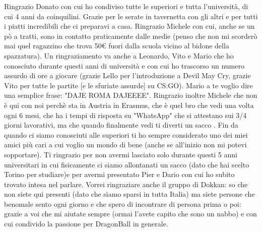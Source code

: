 Ringrazio Donato con cui ho condiviso tutte le superiori e tutta l'università, di cui 4 anni da coinquilini. Grazie per le serate in tavernetta con gli altri e per tutti i piatti incredibili che ci preparavi a casa. Ringrazio Michele con cui, anche se un pò a tratti, sono in contatto praticamente dalle medie (penso che non mi scorderò mai quel ragazzino che trova 50€ fuori dalla scuola vicino al bidone della spazzatura). Un ringraziamento va anche a Leonardo, Vito e Mario che ho conosciuto durante questi anni di università e con cui ho trascorso un numero assurdo di ore a giocare  (grazie Lello per l'introduzione a Devil May Cry, grazie Vito per tutte le partite [e le sfuriate assurde] su CS:GO). Mario a te voglio dire una semplice frase: "DAJE ROMA DAJEEEE". Ringrazio inoltre Michele che non è qui con noi perchè sta in Austria in Erasmus, che è quel bro che vedi una volta ogni 6 mesi, che ha i tempi di risposta su "WhatsApp" che si attestano sui 3/4 giorni lavorativi, ma che quando finalmente vedi ti diverti un sacco . Fin da quando ci siamo conosciuti alle superiori ti ho sempre considerato uno dei miei amici più cari a cui voglio un mondo di bene (anche se all'inizio non mi potevi sopportare). Ti ringrazio per non avermi lasciato solo durante questi 5 anni universitari in cui fisicamente ci siamo allontanati un sacco (dato che hai scelto Torino per studiare)e per avermi presentato Pier e Dario con cui ho subito trovato intesa nel parlare.
Vorrei ringraziare anche il gruppo di Dokkan: so che non siete qui presenti (dato che siamo sparsi in tutta Italia) ma siete persone che benomale sento ogni giorno e che spero di incontrare di persona prima o poi: grazie a voi che mi aiutate sempre (ormai l'avete capito che sono un nabbo) e con cui condivido la passione per DragonBall in generale.
